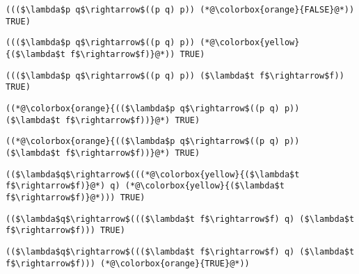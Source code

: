 \documentclass{beamer}
\begin{document}
\begin{frame}[fragile]{\CurrentSection}
\lstset{basicstyle=\ttfamily\small}\lstset{numbers=none}\lstset{language=ML}\begin{lstlisting}
((($\lambda$p q$\rightarrow$((p q) p)) (*@\colorbox{orange}{FALSE}@*)) TRUE)
\end{lstlisting}
\pause\lstset{language=ML}\begin{lstlisting}
((($\lambda$p q$\rightarrow$((p q) p)) (*@\colorbox{yellow}{($\lambda$t f$\rightarrow$f)}@*)) TRUE)
\end{lstlisting}

\end{frame}

\begin{frame}[fragile]{\CurrentSection}
\lstset{basicstyle=\ttfamily\small}\lstset{numbers=none}\lstset{language=ML}\begin{lstlisting}
((($\lambda$p q$\rightarrow$((p q) p)) ($\lambda$t f$\rightarrow$f)) TRUE)
\end{lstlisting}
\pause\lstset{language=ML}\begin{lstlisting}
((*@\colorbox{orange}{(($\lambda$p q$\rightarrow$((p q) p)) ($\lambda$t f$\rightarrow$f))}@*) TRUE)
\end{lstlisting}

\end{frame}

\begin{frame}[fragile]{\CurrentSection}
\lstset{basicstyle=\ttfamily\small}\lstset{numbers=none}\lstset{language=ML}\begin{lstlisting}
((*@\colorbox{orange}{(($\lambda$p q$\rightarrow$((p q) p)) ($\lambda$t f$\rightarrow$f))}@*) TRUE)
\end{lstlisting}
\pause\lstset{language=ML}\begin{lstlisting}
(($\lambda$q$\rightarrow$(((*@\colorbox{yellow}{($\lambda$t f$\rightarrow$f)}@*) q) (*@\colorbox{yellow}{($\lambda$t f$\rightarrow$f)}@*))) TRUE)
\end{lstlisting}

\end{frame}

\begin{frame}[fragile]{\CurrentSection}
\lstset{basicstyle=\ttfamily\small}\lstset{numbers=none}\lstset{language=ML}\begin{lstlisting}
(($\lambda$q$\rightarrow$((($\lambda$t f$\rightarrow$f) q) ($\lambda$t f$\rightarrow$f))) TRUE)
\end{lstlisting}
\pause\lstset{language=ML}\begin{lstlisting}
(($\lambda$q$\rightarrow$((($\lambda$t f$\rightarrow$f) q) ($\lambda$t f$\rightarrow$f))) (*@\colorbox{orange}{TRUE}@*))
\end{lstlisting}

\end{frame}
\end{document}

